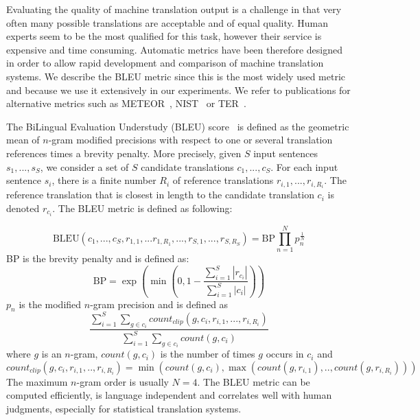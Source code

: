     Evaluating the quality of machine translation output is a challenge in that very often many possible
    translations are acceptable and of equal quality. Human experts seem to be the most qualified for this task, however
    their service is expensive and time consuming. Automatic metrics have been therefore designed
    in order to allow rapid development and comparison of machine translation systems. We describe
    the BLEU metric since this is the most widely used metric and because we use it extensively in our experiments.
    We refer to publications for alternative metrics such as 
    METEOR~\citep{banerjee-lavie:2005:MTSumm}, NIST~\citep{doddington:2002:HLTR} or
    TER~\citep{snover-dorr-schwartz-micciulla-makhoul:2006:AMTA}.

    The BiLingual Evaluation Understudy (BLEU) score~\citep{papineni-roukos-ward-zhu:2002:ACL} is defined as 
    the geometric mean of $n$-gram modified precisions with respect
    to one or several translation references times a brevity penalty. More precisely, given $S$ input sentences
    $s_1,...,s_S$, we consider a set of $S$ candidate translations $c_1,...,c_S$. For each input sentence $s_i$, there is
    a finite number $R_i$ of reference translations $r_{i,1},...,r_{i,R_i}$. The reference translation
    that is closest in length to the candidate translation $c_i$ is denoted $r_{c_i}$. The BLEU metric is defined as following:

    \begin{equation}
      \mbox{BLEU}(c_1,...,c_S,r_{1,1},...r_{1,R_1},...,r_{S,1},...,r_{S,R_S}) = \mbox{BP} \prod_{n=1}^N p_n^{\frac{1}{N}}
    \end{equation}
%
    BP is the brevity penalty and is defined as:
%
    \begin{equation}
      \mbox{BP} = \exp(\min(0,1-\frac{\sum_{i=1}^S |r_{c_i}|}{\sum_{i=1}^S |c_i|}))
    \end{equation}
%
    $p_n$ is the modified $n$-gram precision and is defined as
%
    \begin{equation}
      \frac{\sum_{i=1}^S \sum_{g \in c_i} count_{clip}(g,c_i,r_{i,1},...,r_{i,R_i})}{\sum_{i=1}^S \sum_{g \in c_i} count(g,c_i)}
    \end{equation}
%
    where $g$ is an $n$-gram, $count(g,c_i)$ is the number of times $g$ occurs in $c_i$ and 
%    
    \begin{equation}
      count_{clip}(g,c_i,r_{i,1},..,r_{i,R_i}) = \min(count(g,c_i),\max(count(g,r_{i,1}),..,count(g,r_{i,R_i})))
    \end{equation}
%
    The maximum $n$-gram order is usually $N=4$. The BLEU metric can be computed efficiently, is language
    independent and correlates well with human judgments, especially for statistical translation systems.


